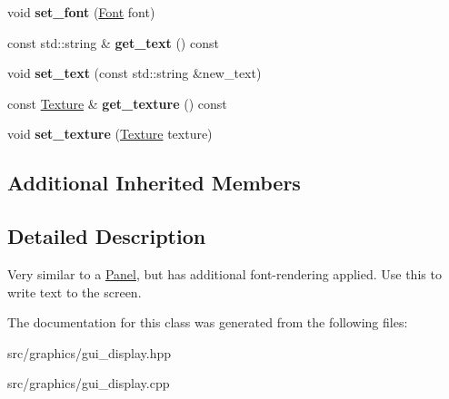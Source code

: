 \begin{DoxyCompactItemize}
\item 
\mbox{\label{class_text_label_a899b24fdb8ce8adf213cb70461aa1d91}} 
void {\bfseries set\+\_\+font} (\mbox{\hyperlink{class_font}{Font}} font)
\item 
\mbox{\label{class_text_label_a3594731b87e5c98a5d574e554e4ebcf0}} 
const std\+::string \& {\bfseries get\+\_\+text} () const
\item 
\mbox{\label{class_text_label_ad8d83bed9697b2f53249218f560fe1a8}} 
void {\bfseries set\+\_\+text} (const std\+::string \&new\+\_\+text)
\item 
\mbox{\label{class_text_label_ab8af6195b3e568d5f8a83024818b6d80}} 
const \mbox{\hyperlink{class_texture}{Texture}} \& {\bfseries get\+\_\+texture} () const
\item 
\mbox{\label{class_text_label_ae39dffa6e09e0ef03f2ef8f980e47076}} 
void {\bfseries set\+\_\+texture} (\mbox{\hyperlink{class_texture}{Texture}} texture)
\end{DoxyCompactItemize}
\subsection*{Additional Inherited Members}


\subsection{Detailed Description}
Very similar to a \mbox{\hyperlink{class_panel}{Panel}}, but has additional font-\/rendering applied. Use this to write text to the screen. 

The documentation for this class was generated from the following files\+:\begin{DoxyCompactItemize}
\item 
src/graphics/gui\+\_\+display.\+hpp\item 
src/graphics/gui\+\_\+display.\+cpp\end{DoxyCompactItemize}
